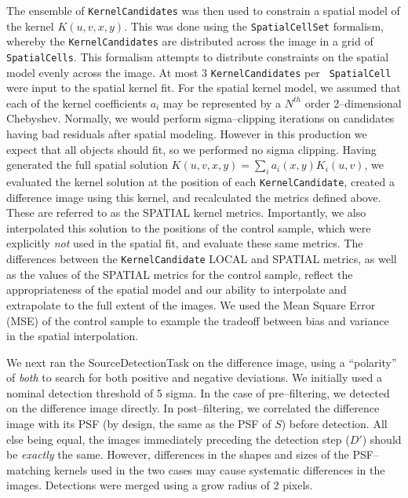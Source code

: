 \documentclass[prd, nofootinbib, floatfix, 11pt,tightenlines,times]{article}
\begin{document}
The ensemble of {\tt KernelCandidates} was then used to constrain a
spatial model of the kernel $K(u,v,x,y)$.  This was done using the
{\tt SpatialCellSet} formalism, whereby the {\tt KernelCandidates} are
distributed across the image in a grid of {\tt SpatialCells}.  This
formalism attempts to distribute constraints on the spatial model
evenly across the image.  At most 3 {\tt KernelCandidates} per {\tt
  SpatialCell} were input to the spatial kernel fit.  For the spatial
kernel model, we assumed that each of the kernel coefficients $a_i$
may be represented by a $N^{th}$ order 2--dimensional Chebyshev.
Normally, we would perform sigma--clipping iterations on candidates
having bad residuals after spatial modeling.  However in this
production we expect that all objects should fit, so we performed no
sigma clipping.  Having generated the full spatial solution
$K(u,v,x,y) = \sum_i a_i(x,y) K_i(u,v)$, we evaluated the kernel
solution at the position of each {\tt KernelCandidate}, created a
difference image using this kernel, and recalculated the metrics
defined above.  These are referred to as the SPATIAL kernel metrics.
Importantly, we also interpolated this solution to the positions of
the control sample, which were explicitly {\it not} used in the
spatial fit, and evaluate these same metrics.  The differences between
the {\tt KernelCandidate} LOCAL and SPATIAL metrics, as well as the
values of the SPATIAL metrics for the control sample, reflect the
appropriateness of the spatial model and our ability to interpolate
and extrapolate to the full extent of the images.  We used the Mean
Square Error (MSE) of the control sample to example the tradeoff
between bias and variance in the spatial interpolation.

We next ran the SourceDetectionTask on the difference image, using a
``polarity'' of {\it both} to search for both positive and negative
deviations.  We initially used a nominal detection threshold of 5
sigma.  In the case of pre--filtering, we detected on the difference
image directly.  In post--filtering, we correlated the difference
image with its PSF (by design, the same as the PSF of $S$) before
detection.  All else being equal, the images immediately preceding the
detection step ($D'$) should be {\it exactly} the same.  However,
differences in the shapes and sizes of the PSF--matching kernels used
in the two cases may cause systematic differences in the images.
Detections were merged using a grow radius of 2 pixels.
\end{document}
